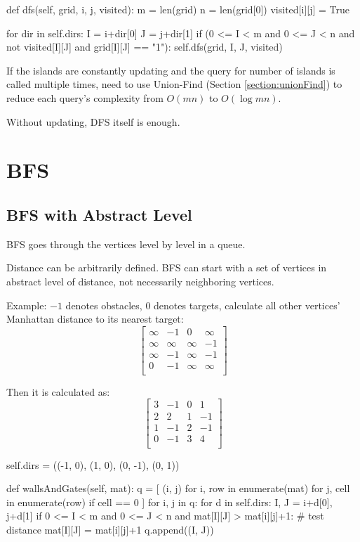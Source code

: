 \begin{python}
  def dfs(self, grid, i, j, visited):
    m = len(grid)
    n = len(grid[0])
    visited[i][j] = True

    for dir in self.dirs:
      I = i+dir[0]
      J = j+dir[1]
      if (0 <= I < m and 0 <= J < n and
        not visited[I][J] and grid[I][J] == "1"):
        self.dfs(grid, I, J, visited)
\end{python}
If the islands are constantly updating and the query for number of islands is called multiple times, need to use Union-Find (Section \ref{section:unionFind}) to reduce each query's complexity from $O(mn)$ to $O(\log mn)$.

Without updating, DFS itself is enough.

\section{BFS}
\subsection{BFS with Abstract Level}
BFS goes through the vertices level by level in a queue. 

Distance can be arbitrarily defined. BFS can start with a set of vertices in abstract level of distance, not necessarily neighboring vertices.

Example: $-1$ denotes obstacles, $0$ denotes targets, calculate all other vertices' Manhattan distance to its nearest target:
$$
\begin{bmatrix}
\infty & -1 & 0 & \infty \\
\infty & \infty & \infty & -1 \\
\infty & -1 & \infty & -1 \\
0 & -1 & \infty & \infty \\
\end{bmatrix}
$$

Then it is calculated as:
$$
\begin{bmatrix}
3 & -1 & 0 & 1 \\
2 & 2 & 1 & -1 \\
1 & -1 & 2 & -1 \\
0 & -1 & 3 & 4 \\
\end{bmatrix}
$$

\begin{python}
self.dirs = ((-1, 0), (1, 0), (0, -1), (0, 1))

def wallsAndGates(self, mat):
  q = [
    (i, j) 
    for i, row in enumerate(mat)
    for j, cell in enumerate(row) 
    if cell == 0
  ]
  for i, j in q:
    for d in self.dirs:
      I, J = i+d[0], j+d[1]
      if 0 <= I < m and 0 <= J < n 
        and mat[I][J] > mat[i][j]+1:  # test distance
        mat[I][J] = mat[i][j]+1
        q.append((I, J))
\end{python}


